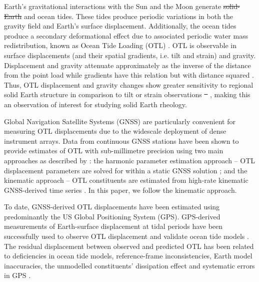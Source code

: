 \documentclass[se, manuscript]{copernicus}
\providecommand{\DIFadd}[1]{{\protect\color{blue}\uwave{#1}}} %
\providecommand{\DIFdel}[1]{{\protect\color{red}\sout{#1}}}                      %
\providecommand{\DIFaddbegin}{} %
\providecommand{\DIFaddend}{} %
\providecommand{\DIFdelbegin}{} %
\providecommand{\DIFdelend}{} %
\begin{document}
\introduction %
Earth’s gravitational interactions with the Sun and the Moon generate \DIFdelbegin \DIFdel{solid-Earth }\DIFdelend \DIFaddbegin \DIFadd{solid Earth }\DIFaddend and ocean tides. These tides produce periodic variations in both the gravity field and Earth’s surface displacement. Additionally, the ocean tides produce a secondary deformational effect due to associated periodic water mass redistribution, known as Ocean Tide Loading (OTL) \citep[e.g.,][]{Agnew2015,Jentzsch1997,Baker1984}. 
OTL is observable in surface displacements (and their spatial gradients, i.e. tilt and strain) and gravity. Displacement and gravity attenuate approximately as the inverse of the distance from the point load while gradients have this relation but with distance squared \citep{Baker1984}. Thus, OTL displacement and gravity changes show greater sensitivity to regional solid Earth structure in comparison to tilt or strain observations \DIFdelbegin \DIFdel{\mbox{%
\cite{Martens2016}}\hspace{0pt}%
}\DIFdelend \DIFaddbegin \DIFadd{\mbox{%
\citep{Martens2016}}\hspace{0pt}%
}\DIFaddend , making this an observation of interest for studying solid Earth rheology.

Global Navigation Satellite Systems (GNSS) are particularly convenient for measuring OTL displacements due to the widescale deployment of dense instrument arrays. Data from continuous GNSS stations have been shown to provide estimates of OTL with sub-millimetre precision using two main approaches as described by \cite{Penna2015}: the harmonic parameter estimation approach – OTL displacement parameters are solved for within a static GNSS solution \citep[e.g.,][]{Schenewerk2001,Allinson2004,King2005,Thomas2006,Yuan2012,Yuan2013}; and the kinematic approach – OTL constituents are \DIFaddbegin \DIFadd{predominantly }\DIFaddend estimated from high-rate kinematic GNSS-derived time series \citep[e.g.,][]{Khan2001,King2003,King2006,Penna2015,Martens2016,Wang2019}. In this paper, we follow the kinematic approach.

To date, GNSS-derived OTL displacements have been estimated using predominantly the US Global Positioning System (GPS). GPS-derived measurements of Earth-surface displacement at tidal periods have been successfully used to observe OTL displacement and validate ocean tide models \citep{Urschl2005,King2005}. The residual displacement between observed and predicted OTL has been related to deficiencies in ocean tide models, reference-frame inconsistencies, Earth model inaccuracies, the unmodelled constituents’ dissipation effect and systematic errors in GPS \citep[e.g.,][]{Thomas2006,Ito2011,Yuan2013,Bos2015}.
\end{document}

